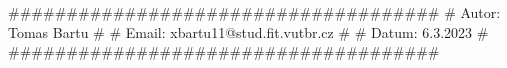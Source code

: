 #####################################
# Autor: Tomas Bartu                #
# Email: xbartu11@stud.fit.vutbr.cz #
# Datum: 6.3.2023                   #
#####################################


